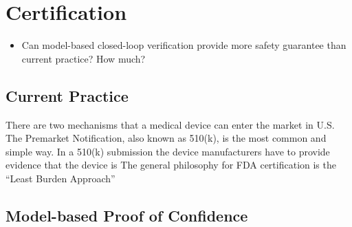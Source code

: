 

\chapter{Certification}
\begin{itemize}
          	\item Can model-based closed-loop verification provide more safety guarantee than current practice? How much?
          \end{itemize}
\section{Current Practice}
There are two mechanisms that a medical device can enter the market in U.S. The Premarket Notification, also known as 510(k), is the most common and simple way. In a 510(k) submission the device manufacturers have to provide evidence that the device is The general philosophy for FDA certification is the "`Least Burden Approach"'
\section{Model-based Proof of Confidence}

